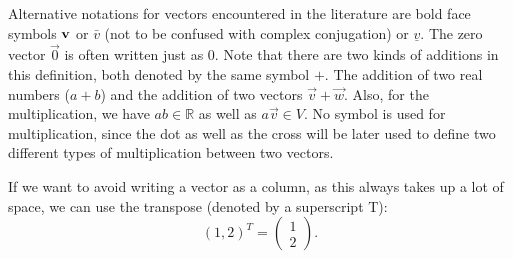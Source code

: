 \documentclass[
  a4paper,
  DIV=11,
  numbers=noendperiod,
  oneside]{scrreprt}
\theoremstyle{definition}
\theoremstyle{remark}
\begin{document}
\begin{tcolorbox}[enhanced jigsaw, opacitybacktitle=0.6, left=2mm, breakable, bottomrule=.15mm, colbacktitle=quarto-callout-note-color!10!white, leftrule=.75mm, titlerule=0mm, rightrule=.15mm, toprule=.15mm, colback=white, toptitle=1mm, colframe=quarto-callout-note-color-frame, coltitle=black, bottomtitle=1mm, title=\textcolor{quarto-callout-note-color}{\faInfo}\hspace{0.5em}{Remark on Notation}, opacityback=0, arc=.35mm]

Alternative notations for vectors encountered in the literature are bold
face symbols \({\bf v}\) or \(\bar v\) (not to be confused with complex
conjugation) or \(\underline v\). The zero vector \(\vec{0}\) is often
written just as \(0\). Note that there are two kinds of additions in
this definition, both denoted by the same symbol \(+\). The addition of
two real numbers (\(a+b\)) and the addition of two vectors
\(\vec{v}+\vec{w}\). Also, for the multiplication, we have
\(ab \in \mathbb{R}\) as well as \(a \vec{v} \in V\). No symbol is used
for multiplication, since the dot as well as the cross will be later
used to define two different types of multiplication between two
vectors.

If we want to avoid writing a vector as a column, as this always takes
up a lot of space, we can use the transpose (denoted by a superscript
T): \[ (1,2)^T = \begin{pmatrix}  1 \\ 2 \end{pmatrix}. \]

\end{tcolorbox}
\end{document}
